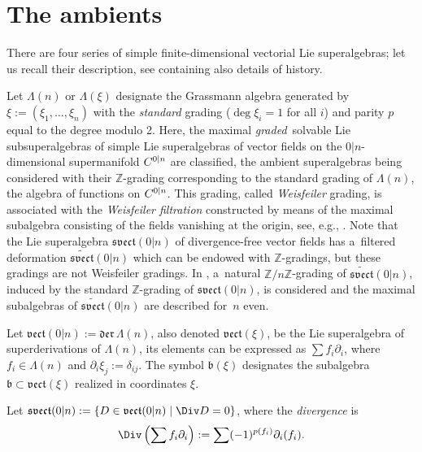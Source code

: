 \documentclass[pdftex]{sigma}
\newcommand{\del}{\partial}
\newcommand {\Zee} {{\mathbb Z}}
\newcommand {\fb} {{\mathfrak{b}}}
\newcommand {\fder} {{\mathfrak{der}}} %
\newcommand {\fsvect} {{\mathfrak{svect}}}
\newcommand {\fvect} {{\mathfrak{vect}}} %
\let\cal\relax
\newcommand {\cal} {\mathcal}
\newcommand {\cC} {{\cal C}}
\newcommand {\<} [2] {{\left.\vphantom{#2}\right.^{#1\!}\!{#2}}}
\numberwithin{equation}{section}
\begin{document}
\section{The ambients} There are four series of simple finite-dimensional vectorial Lie superalgebras; let us recall their description, see \cite{Lo} containing also details of history.

Let $\Lambda(n)$ or $\Lambda(\xi)$ designate the Grassmann algebra generated by $\xi:=(\xi_1, \dots, \xi_n)$ with the \textit{standard} grading ($\deg \xi_i=1$ for all $i$) and parity $p$ equal to the degree modulo 2. Here, the maximal \textit{graded}\, solvable Lie subsuperalgebras of simple Lie superalgebras of vector fields on the $0|n$-dimensional supermanifold $\cC^{0|n}$ are classified, the ambient superalgebras being considered with their $\Zee$-grading corresponding to the standard grading of $\Lambda(n)$, the algebra of functions on $\cC^{0|n}$. This grading, called \textit{Weisfeiler} grading, is associated with the \textit{Weisfeiler filtration} constructed by means of the maximal subalgebra consisting of the fields vanishing at the origin, see, e.g., \cite{BGLLS}. Note that the Lie superalgebra $\fsvect(0|n)$ of divergence-free vector fields has a~filtered deformation $\widetilde{\fsvect}(0|n)$ which can be endowed with $\Zee$-gradings, but these gradings are not Weisfeiler gradings. In \cite{BLM}, a~natural $\Zee/n\Zee$-grading of $\widetilde{\fsvect}(0|n)$, induced by the standard $\Zee$-grading of $\fsvect(0|n)$, is considered and the maximal subalgebras of $\widetilde{\fsvect}(0|n)$ are described for~$n$ even.

Let $\fvect(0|n):=\fder\, \Lambda(n)$, also denoted $\fvect(\xi)$, be the Lie superalgebra of superderivations of $ \Lambda(n)$, its elements can be expressed as $\sum f_i\del_i$, where $f_i\in\Lambda(n)$ and $\del_i\xi_j:=\delta_{ij}$. The symbol $\fb(\xi)$
designates the subalgebra $\fb\subset \fvect(\xi)$ realized in coordinates $\xi$.

Let $\fsvect(0|n):=\{D\in\fvect(0|n)\mid \Div D=0\}$, where the \textit{divergence} is
\[
\Div \left(\sum f_i\del_i\right):=\sum (-1)^{p(f_i)}\del_i(f_i).
\]
\end{document}

